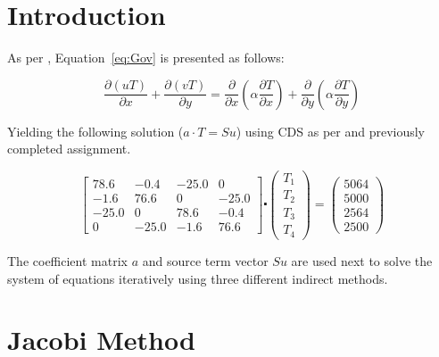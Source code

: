 
\chapter{Introduction}
\label{chap:intro}

As per \cite{assign}, Equation~\ref{eq:Gov} is presented as follows:

\begin{equation}
	\label{eq:Gov}	
	\frac{\partial(uT)}{\partial x} + \frac{\partial(vT)}{\partial y}= \frac{\partial}{\partial x} \left( \alpha \frac{\partial T}{\partial x} \right) + \frac{\partial}{\partial y} \left( \alpha \frac{\partial T}{\partial y} \right)
\end{equation}

Yielding the following solution ($a \cdot T = Su$) using CDS as per \cite{assign} and previously completed assignment.

\begin{equation*}
	\begin{bmatrix}
		78.6	&	-0.4	&	-25.0 	&	0		\\
		-1.6	&	76.6 	&	0  		&	-25.0	\\
		-25.0	&	0   	&	78.6	&	-0.4	\\
		0  		&	-25.0	&	-1.6	&	76.6
	\end{bmatrix}
	\centerdot 
	\begin{pmatrix} T_1	\\	T_2	\\	T_3	\\ T_4	\end{pmatrix}
	=
	\begin{pmatrix} 5064	\\	5000	\\	2564	\\ 2500 \end{pmatrix}	
\end{equation*}

The coefficient matrix $a$ and source term vector $Su$ are used next to solve the system of equations iteratively using three different indirect methods.

\chapter{Jacobi Method}
\label{chap:jacobi}

